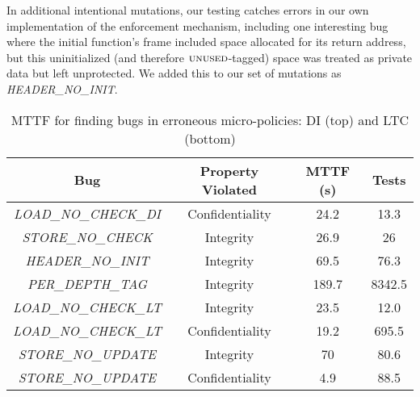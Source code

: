 \documentclass[10pt,conference]{ieeetran}%
\theoremstyle{definition}
\begin{document}
In additional intentional mutations, our testing catches errors in our
own implementation of the enforcement mechanism, including one interesting
bug where the initial function's frame included space allocated for its
return address, but this uninitialized (and therefore \(\textsc{unused}\)-tagged)
space was treated as private data but left unprotected. We added this to
our set of mutations as {\em HEADER\_NO\_INIT}.

\begin{table}[]
\centering
\begin{tabular}{c|c|c|c}
  Bug & Property Violated & MTTF (s) & Tests \\
  \hline
      {\em LOAD\_NO\_CHECK\_DI}  & Confidentiality & 24.2 & 13.3 \\
      {\em STORE\_NO\_CHECK} & Integrity & 26.9 & 26 \\
      {\em HEADER\_NO\_INIT} & Integrity & 69.5 & 76.3 \\
  \hline
  \hline
      {\em PER\_DEPTH\_TAG} & Integrity & 189.7 & 8342.5  \\
      {\em LOAD\_NO\_CHECK\_LT}  & Integrity & 23.5 & 12.0 \\
      {\em LOAD\_NO\_CHECK\_LT}  & Confidentiality & 19.2 & 695.5 \\
      {\em STORE\_NO\_UPDATE} & Integrity & 70 & 80.6  \\
      {\em STORE\_NO\_UPDATE} & Confidentiality & 4.9 & 88.5 \\
  \hline
\end{tabular}
\vspace*{1em}
\caption{MTTF for finding bugs in erroneous micro-policies: DI (top) and LTC (bottom)}
\vspace*{-2em}
\label{tab:bug-table}
\end{table}
\end{document}
